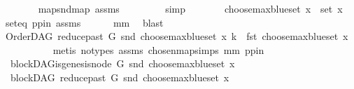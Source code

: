\begin{isabellebody}
\ \ \ \ \ \ \isamarkupfalse%
\ map{\isacharunderscore}{\kern0pt}snd{\isacharunderscore}{\kern0pt}map\ assms{\isacharparenleft}{\kern0pt}{}{\isacharparenright}{\kern0pt}\ \isanewline
\ \ \ \ \ \ \isamarkupfalse%
\ simp\isanewline
\ \ \ \ \isamarkupfalse%
\ \isamarkupfalse%
\ {\isachardoublequoteopen}choose{\isacharunderscore}{\kern0pt}max{\isacharunderscore}{\kern0pt}blue{\isacharunderscore}{\kern0pt}set\ x\ {\isasymin}\ set\ x{\isachardoublequoteclose}\ \isamarkupfalse%
\ seteq\ pp{\isacharunderscore}{\kern0pt}in\ assms{\isacharparenleft}{\kern0pt}{}{\isacharparenright}{\kern0pt}\isanewline
\ \ \ \ \ \ mm\ \isamarkupfalse%
\ blast\ \isanewline
\ \ \ \ \isamarkupfalse%
\ {\isachardoublequoteopen}OrderDAG\ {\isacharparenleft}{\kern0pt}reduce{\isacharunderscore}{\kern0pt}past\ G\ {\isacharparenleft}{\kern0pt}snd\ {\isacharparenleft}{\kern0pt}choose{\isacharunderscore}{\kern0pt}max{\isacharunderscore}{\kern0pt}blue{\isacharunderscore}{\kern0pt}set\ x{\isacharparenright}{\kern0pt}{\isacharparenright}{\kern0pt}{\isacharparenright}{\kern0pt}\ k\ {\isacharequal}{\kern0pt}\ fst\ {\isacharparenleft}{\kern0pt}choose{\isacharunderscore}{\kern0pt}max{\isacharunderscore}{\kern0pt}blue{\isacharunderscore}{\kern0pt}set\ x{\isacharparenright}{\kern0pt}{\isachardoublequoteclose}\isanewline
\ \ \ \ \ \ \ \ \ \isamarkupfalse%
\ {\isacharparenleft}{\kern0pt}metis\ {\isacharparenleft}{\kern0pt}no{\isacharunderscore}{\kern0pt}types{\isacharparenright}{\kern0pt}\ assms{\isacharparenleft}{\kern0pt}{}{\isacharparenright}{\kern0pt}\ chosen{\isacharunderscore}{\kern0pt}map{\isacharunderscore}{\kern0pt}simps{}\ mm\ pp{\isacharunderscore}{\kern0pt}in{\isacharparenright}{\kern0pt}\ \isanewline
\ \ \ \ \isamarkupfalse%
\ {\isachardoublequoteopen}{\isasymnot}\ blockDAG{\isachardot}{\kern0pt}is{\isacharunderscore}{\kern0pt}genesis{\isacharunderscore}{\kern0pt}node\ G\ {\isacharparenleft}{\kern0pt}snd\ {\isacharparenleft}{\kern0pt}choose{\isacharunderscore}{\kern0pt}max{\isacharunderscore}{\kern0pt}blue{\isacharunderscore}{\kern0pt}set\ x{\isacharparenright}{\kern0pt}{\isacharparenright}{\kern0pt}{\isachardoublequoteclose}\isanewline
\ \ \ \ \isamarkupfalse%
\ \isamarkupfalse%
\ {\isachardoublequoteopen}\ blockDAG\ {\isacharparenleft}{\kern0pt}reduce{\isacharunderscore}{\kern0pt}past\ G\ {\isacharparenleft}{\kern0pt}snd\ {\isacharparenleft}{\kern0pt}choose{\isacharunderscore}{\kern0pt}max{\isacharunderscore}{\kern0pt}blue{\isacharunderscore}{\kern0pt}set\ x{\isacharparenright}{\kern0pt}{\isacharparenright}{\kern0pt}{\isacharparenright}{\kern0pt}{\isachardoublequoteclose}\isanewline

\end{isabellebody}
